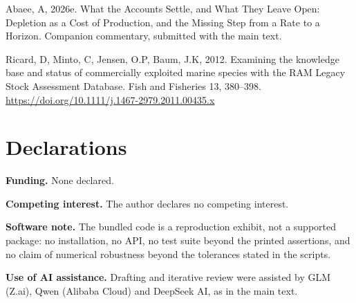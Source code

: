 \documentclass[11pt]{article}
\begin{document}
Abaee, A, 2026e. What the Accounts Settle, and What They Leave Open: Depletion as a Cost of Production, and the Missing Step from a Rate to a Horizon. Companion commentary, submitted with the main text.

Ricard, D, Minto, C, Jensen, O.P, Baum, J.K, 2012. Examining the knowledge base and status of commercially exploited marine species with the RAM Legacy Stock Assessment Database. Fish and Fisheries 13, 380--398. \url{https://doi.org/10.1111/j.1467-2979.2011.00435.x}

\vspace{0.8em}

\section*{Declarations}\label{declarations}

\textbf{Funding.} None declared.

\textbf{Competing interest.} The author declares no competing interest.

\textbf{Software note.} The bundled code is a reproduction exhibit, not a supported package: no installation, no API, no test suite beyond the printed assertions, and no claim of numerical robustness beyond the tolerances stated in the scripts.

\textbf{Use of AI assistance.} Drafting and iterative review were assisted by GLM (Z.ai), Qwen (Alibaba Cloud) and DeepSeek AI, as in the main text.
\end{document}
